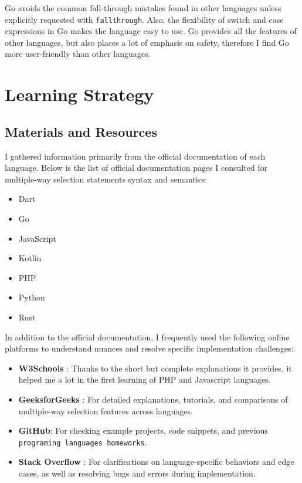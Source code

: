 \documentclass{article}
\begin{document}
Go avoids the common fall-through mistakes found in other languages unless explicitly requested with \texttt{fallthrough}. Also, the flexibility of switch and case expressions in Go makes the language easy to use. Go provides all the features of other languages, but also places a lot of emphasis on safety, therefore I find Go more user-friendly than other languages.

\newpage

\section{Learning Strategy}
\subsection{Materials and Resources}

I gathered information primarily from the official documentation of each language. Below is the list of official documentation pages I consulted for multiple-way selection statements syntax and semantics:

\begin{itemize}
    \item Dart \cite{dartdocs}
    \item Go \cite{godocs}
    \item JavaScript \cite{jsdocs}
    \item Kotlin \cite{kotlindocs}
    \item PHP \cite{phpdocs}
    \item Python \cite{pydocs, numpydocs}
    \item Rust \cite{rustdocs}
\end{itemize}

In addition to the official documentation, I frequently used the following online platforms to understand nuances and resolve specific implementation challenges:

\begin{itemize}
    \item \textbf{W3Schools} \cite{w3schools}: Thanks to the short but complete explanations it provides, it helped me a lot in the first learning of PHP and Javascript languages.
    \item \textbf{GeeksforGeeks} \cite{geeksforgeeks}: For detailed explanations, tutorials, and comparisons of multiple-way selection features across languages.
    \item \textbf{GitHub}: \cite{github} For checking example projects, code snippets, and previous \texttt{programing languages homeworks}.
    \item \textbf{Stack Overflow} \cite{stackoverflow}: For clarifications on language-specific behaviors and edge cases, as well as resolving bugs and errors during implementation.
\end{itemize}
\end{document}
